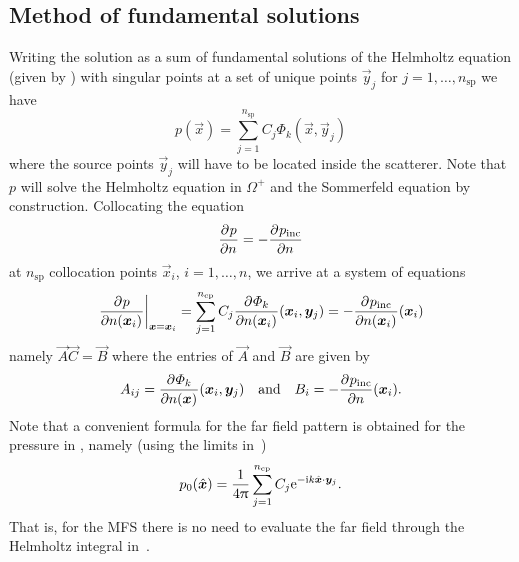 \subsection{Method of fundamental solutions}
Writing the solution as a sum of fundamental solutions of the Helmholtz equation (given by ) with singular points at a set of unique points $\vec{y}_j$ for $j=1,\dots,n_{\mathrm{sp}}$ we have
\begin{equation}\label{Eq:pressureMFS}
	p(\vec{x}) = \sum_{j=1}^{n_{\mathrm{sp}}} C_j \Phi_k(\vec{x},\vec{y}_j) 
\end{equation}
where the source points $\vec{y}_j$ will have to be located inside the scatterer. Note that $p$ will solve the Helmholtz equation in $\Omega^+$ and the Sommerfeld equation by construction. Collocating the equation
\begin{equation*}
	\frac{\partial^{}p}{\partial n^{}} = -\frac{\partial^{}p_{\mathrm{inc}}}{\partial n^{}}
\end{equation*}
at $n_{\mathrm{sp}}$ collocation points $\vec{x}_i$, $i = 1,\dots,n$, we arrive at a system of equations
\begin{equation}\label{Eq:MFSsystem}
	\left.\pderiv{p}{n(\vec{x}_i)}\right|_{\vec{x}=\vec{x}_i} = \sum_{j=1}^{n_{\mathrm{cp}}} C_j \pderiv{\Phi_k}{n(\vec{x}_i)}(\vec{x}_i,\vec{y}_j) = -\pderiv{p_{\mathrm{inc}}}{n(\vec{x}_i)}(\vec{x}_i)
\end{equation}
namely $\vec{A}\vec{C} = \vec{B}$ where the entries of $\vec{A}$ and $\vec{B}$ are given by
\begin{equation*}
	A_{ij} = \pderiv{\Phi_k}{n(\vec{x})}(\vec{x}_i,\vec{y}_j)\quad\text{and}\quad B_i = -\pderiv{p_{\mathrm{inc}}}{n}(\vec{x}_i).
\end{equation*}
Note that a convenient formula for the far field pattern is obtained for the pressure in , namely (using the limits in~)
\begin{equation*}
	p_0(\hat{\vec{x}}) = \frac{1}{4\PI}\sum_{j=1}^{n_{\mathrm{cp}}} C_j \euler^{-\imag k \hat{\vec{x}}\cdot\vec{y}_j}.
\end{equation*}
That is, for the MFS there is no need to evaluate the far field through the Helmholtz integral in~.

